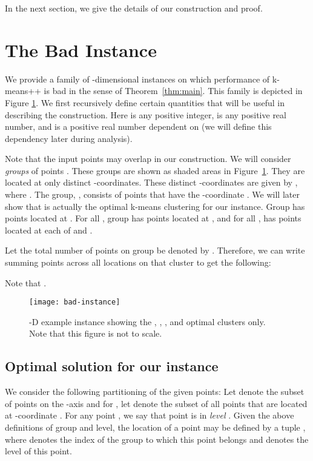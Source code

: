 \documentclass[11pt]{article}
\begin{document}
In the next section, we give the details of our construction and proof.


\section{The Bad Instance} 

We provide a family of -dimensional instances on which performance of k-means++ is bad in the sense of Theorem~\ref{thm:main}. 
This family is depicted in Figure \ref{fig1}. 
We first recursively define certain quantities that will be useful in describing the construction. 
Here  is any positive integer,  is any positive real number, and  is a positive real number dependent on  (we will define this dependency later during analysis).


Note that the input points may overlap in our construction.
We will consider  {\em groups} of points .
These groups are shown as shaded areas in Figure~\ref{fig1}.
They are located at only  distinct -coordinates.
These  distinct -coordinates are given by , where 
.
The  group, , consists of points that have the -coordinate .
We will later show that  is actually the optimal k-means clustering for our instance.
Group  has  points located at . 
For all , group  has  points located at , and for all ,  has  points located at each of  and .

Let the total number of points on  group be denoted by . 
Therefore, we can write summing points across all locations on that cluster to get the following:


Note that .
\begin{figure}[ht]        
        \label{fig1}
        \begin{center}
                \texttt{[image: bad-instance]}
        \end{center}
        \caption{-D example instance showing the , , , and  optimal clusters only. Note that this figure is not to scale.}
\end{figure}



\subsection{Optimal solution for our instance} 
We consider the following partitioning of the given points: 
Let  denote the subset of points on the -axis and for ,
let  denote the subset of all points that are located at -coordinate .
For any point , we say that point  is in {\em level} .
Given the above definitions of group and level, the location of a point may be defined by a tuple , where  denotes the index of the group to which this point belongs and  denotes the level of this point.
\end{document}
